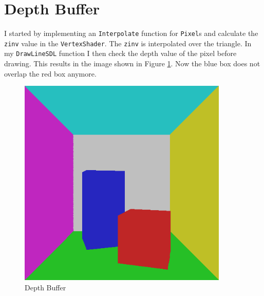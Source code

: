 \section{Depth Buffer}
I started by implementing an \texttt{Interpolate} function for \texttt{Pixel}s and calculate the \texttt{zinv}
value in the \texttt{VertexShader}. The \texttt{zinv} is interpolated over the triangle. In my \texttt{DrawLineSDL} function I then check the depth value
of the pixel before drawing. This results in the image shown in Figure \ref{fig:depthBuffer}.
Now the blue box does not overlap the red box anymore.
\begin{figure}[ht]
    \centering
    \includegraphics[width=10cm]{screenshots/depth_buffer.png}
    \caption{Depth Buffer}
    \label{fig:depthBuffer}
\end{figure}

